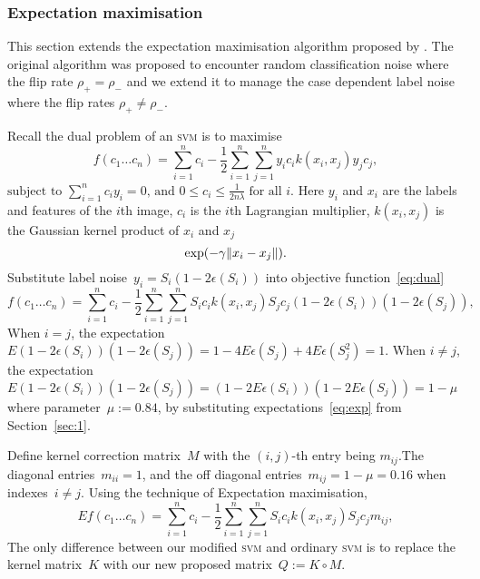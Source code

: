 \documentclass{article} %
\DeclarePairedDelimiter{\norm}{\lVert}{\rVert}
\begin{document}
\subsubsection{Expectation maximisation}
This section extends the expectation maximisation algorithm proposed by \citet{pmlr-v20-biggio11}. The original algorithm was proposed to encounter random classification noise where the flip rate $\rho_+=\rho_-$ and we extend it to manage the case dependent label noise where the flip rates $\rho_+\neq\rho_-$.

Recall the dual problem of an \textsc{svm} is to maximise
\begin{equation}
   f(c_{1}\ldots c_{n})=\sum _{i=1}^{n}c_{i}-{\frac {1}{2}}\sum _{i=1}^{n}\sum _{j=1}^{n}y_{i}c_{i}k(x_{i},x_{j})y_{j}c_{j}, \label{eq:dual}
\end{equation}
\begin{math}
{\text{subject to }}\sum _{i=1}^{n}c_{i}y_{i}=0,\,{\text{and }}0\leq c_{i}\leq {\frac {1}{2n\lambda }}\;{\text{for all }}i. 
\end{math} 
Here $y_i$ and $x_i$ are the labels and features of the $i$th image, $c_i$ is the $i$th Lagrangian multiplier, $k(x_i,x_j)$ is the Gaussian kernel product of $x_i$ and $x_j$
\begin{equation*}
\exp(-\gamma\norm{x_i-x_j}).
\end{equation*}
Substitute label noise~$y_i=S_i(1-2\epsilon(S_i))$ into objective function~\eqref{eq:dual}
\begin{equation}
   f(c_{1}\ldots c_{n})=\sum _{i=1}^{n}c_{i}-{\frac {1}{2}}\sum _{i=1}^{n}\sum _{j=1}^{n}S_{i}c_{i}k(x_{i},x_{j})S_{j}c_{j}(1-2\epsilon(S_i))(1-2\epsilon(S_j)), \label{eq:dual2}
\end{equation}
When $i=j$, the expectation~$E(1-2\epsilon(S_i))(1-2\epsilon(S_j))=1-4E\epsilon(S_j)+4E\epsilon(S_j^2)=1$. When $i\neq j$, the expectation~$E(1-2\epsilon(S_i))(1-2\epsilon(S_j))=(1-2E\epsilon(S_i))(1-2E\epsilon(S_j))=1-\mu$ where parameter~$\mu:=0.84$, by substituting expectations~\eqref{eq:exp} from Section~\ref{sec:1}. 

Define kernel correction matrix~$M$ with the $(i,j)$-th entry being $m_{ij}$.The diagonal entries~$m_{ii}=1 $, and the off diagonal entries~$m_{ij}=1-\mu=0.16$ when indexes~$i\neq j$. Using the technique of Expectation maximisation, 
\begin{equation}
   Ef(c_{1}\ldots c_{n})=\sum _{i=1}^{n}c_{i}-{\frac {1}{2}}\sum _{i=1}^{n}\sum _{j=1}^{n}S_{i}c_{i}k(x_{i},x_{j})S_{j}c_{j}m_{ij}, \label{eq:dual3}
\end{equation}
The only difference between our modified \textsc{svm} and ordinary \textsc{svm} is to replace the kernel matrix~$K$ with our new proposed matrix~$Q:=K\circ M$.
\end{document}
